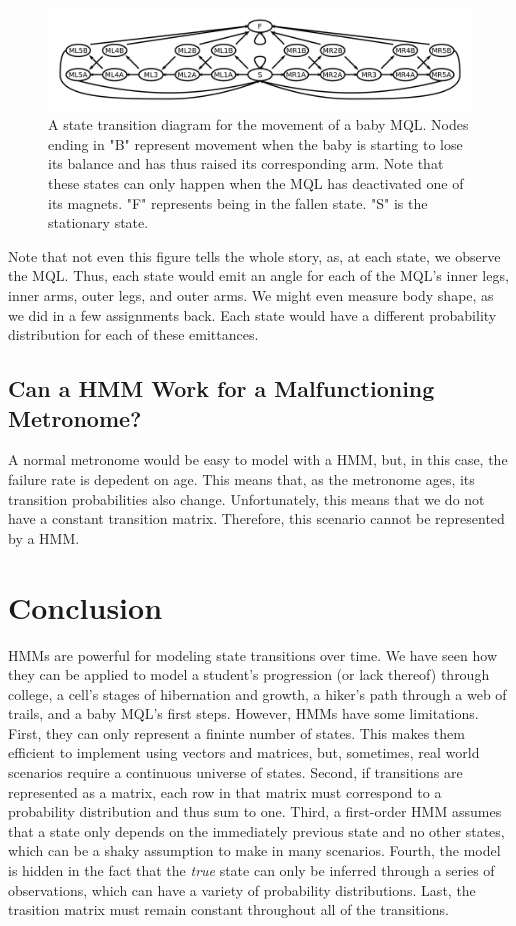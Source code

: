 \documentclass{article}
\begin{document}
\begin{figure}[!ht]
	\centering
	\includegraphics[width=160mm]{figs/baby-mql.png}
	\caption{A state transition diagram for the movement of a baby MQL. Nodes 
        ending in "B" represent movement when the baby is starting to lose its 
        balance and has thus raised its corresponding arm. Note that these 
        states can only happen when the MQL has deactivated one of its magnets. 
        "F" represents 
        being in the fallen state. "S" is the stationary state.}
\end{figure}

Note that not even this figure tells the whole story, as, at each state, we 
observe the MQL. Thus, each state would emit an angle for each of the MQL's 
inner legs, inner arms, outer legs, and outer arms. We might even measure body 
shape, as we did in a few assignments back. Each state would have a different 
probability distribution for each of these emittances.

\subsection{Can a HMM Work for a Malfunctioning Metronome?}

A normal metronome would be easy to model with a HMM, but, in this case, the 
failure rate is depedent on age. This means that, as the metronome ages, its 
transition probabilities also change. Unfortunately, 
this means that we do not have a constant transition matrix. Therefore, this 
scenario cannot be represented by a HMM.

\section{Conclusion}

HMMs are powerful for modeling state transitions over time. We have seen how 
they can be applied to model a student's progression (or lack thereof) through 
college, a cell's stages of hibernation and growth, a hiker's path through a web 
of trails, and a baby MQL's first steps. However, HMMs have 
some limitations. First, they can only represent a fininte number of states. 
This makes them efficient to implement using vectors and matrices, but, 
sometimes, real world scenarios require a continuous universe of states. Second, 
if transitions are represented as a matrix, each row in that matrix must 
correspond to a probability distribution and thus sum to one. Third, a 
first-order HMM assumes that a state only depends on the immediately previous 
state and no other states, which can be a shaky assumption to make in many 
scenarios. Fourth, the model is hidden in the fact that the \textit{true} state 
can only be inferred through a series of observations, which can have a variety 
of probability distributions. Last, the trasition matrix must remain constant 
throughout all of the transitions.
\end{document}
